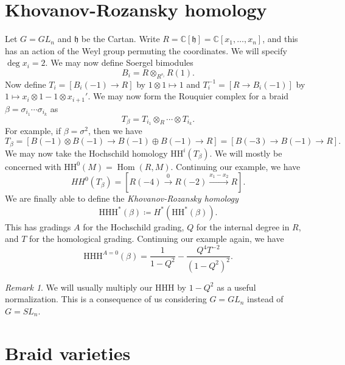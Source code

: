 \documentclass[leqno, openany]{memoir}
\theoremstyle{definition}
\theoremstyle{remark}
\newtheorem{rmk}[thm]{Remark}
\theoremstyle{plain}
\theoremstyle{definition}
\theoremstyle{remark}
\newcommand{\C}{\mathbb{C}}
\newcommand{\h}{\mathfrak{h}}
\newcommand{\mr}[1]{\mathrm{#1}}
\newcommand{\1}{\mathbf{1}}
\newcommand{\2}{\mathbf{2}}
\newcommand{\3}{\mathbf{3}}
\DeclareMathOperator{\Hom}{Hom}
\begin{document}
\section{Khovanov-Rozansky homology}%
\label{sec:khovanov_rozansky_homology}

Let $G = GL_n$ and $\h$ be the Cartan. Write $R = \C[\h] = \C[x_1, \ldots, x_n]$, and this has an action of the Weyl group permuting the coordinates. We will specify $\deg x_i = 2$. We may now define Soergel bimodules
\[ B_i = R \otimes_{R^{s_i}} R(1). \]
Now define $T_i = [B_i(-1) \to R]$ by $1 \otimes 1 \mapsto 1$ and $T_i^{-1} = [R \to B_i(-1)]$ by $1 \mapsto x_i \otimes 1 - 1 \otimes x_{i+1}'$. We may now form the Rouquier complex for a braid $\beta = \sigma_{i_1} \cdots \sigma_{i_k}$ as
\[ T_{\beta} = T_{i_1} \otimes_R \cdots \otimes T_{i_k}. \]
For example, if $\beta = \sigma^2$, then we have
\[ T_{\beta} = [B(-1) \otimes B(-1) \to B(-1) \oplus B(-1) \to R] = [B(-3) \to B(-1) \to R]. \]
We may now take the Hochschild homology $\mr{HH}^i(T_{\beta})$. We will mostly be concerned with $\mr{HH}^0(M) = \Hom(R, M)$. Continuing our example, we have
\[ HH^0(T_{\beta}) = [R(-4) \xrightarrow{0} R(-2) \xrightarrow{x_1 - x_2} R]. \]
We are finally able to define the \textit{Khovanov-Rozansky homology}
\[ \mr{HHH}^*(\beta) \coloneqq H^*(\mr{HH}^*(\beta)). \]
This has gradings $A$ for the Hochschild grading, $Q$ for the internal degree in $R$, and $T$ for the homological grading. Continuing our example again, we have
\[ \mr{HHH}^{A=0}(\beta) = \frac{1}{1-Q^2} - \frac{Q^4 T^{-2}}{{(1-Q^2)}^2}. \]

\begin{rmk}
    We will usually multiply our $\mr{HHH}$ by $1-Q^2$ as a useful normalization. This is a consequence of us considering $G = GL_n$ instead of $G = SL_n$.
\end{rmk}

\section{Braid varieties}%
\label{sec:braid_varieties}
\end{document}
